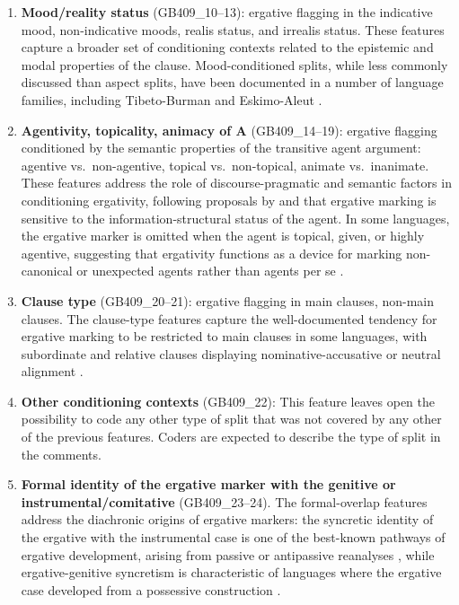 \documentclass[12pt,a4paper]{article}
\begin{document}
\begin{enumerate}
\item \textbf{Mood/reality status} (GB409\_10--13): ergative flagging in the indicative mood, non-indicative moods, realis status, and irrealis status. These features capture a broader set of conditioning contexts related to the epistemic and modal properties of the clause. Mood-conditioned splits, while less commonly discussed than aspect splits, have been documented in a number of language families, including Tibeto-Burman \cite{delancey1981} and Eskimo-Aleut \cite{miyaoka2012}.

\item \textbf{Agentivity, topicality, animacy of A} (GB409\_14--19): ergative flagging conditioned by the semantic properties of the transitive agent argument: agentive vs.\ non-agentive, topical vs.\ non-topical, animate vs.\ inanimate. These features address the role of discourse-pragmatic and semantic factors in conditioning ergativity, following proposals by \cite{givon2001} and \cite{duBois1987} that ergative marking is sensitive to the information-structural status of the agent. In some languages, the ergative marker is omitted when the agent is topical, given, or highly agentive, suggesting that ergativity functions as a device for marking non-canonical or unexpected agents rather than agents per se \cite{mcgregor2010}.

\item \textbf{Clause type}
(GB409\_20--21): ergative flagging in main clauses, non-main clauses. The clause-type features capture the well-documented tendency for ergative marking to be restricted to main clauses in some languages, with subordinate and relative clauses displaying nominative-accusative or neutral alignment \cite{dixon1994}.

\item \textbf{Other conditioning contexts} (GB409\_22): This feature leaves open the possibility to code any other type of split that was not covered by any other of the previous features. Coders are expected to describe the type of split in the comments.

\item \textbf{Formal identity of the ergative marker with the genitive or instrumental/comitative} (GB409\_23--24). The formal-overlap features address the diachronic origins of ergative markers: the syncretic identity of the ergative with the instrumental case is one of the best-known pathways of ergative development, arising from passive or antipassive reanalyses \cite{garrett1990,estival1985}, while ergative-genitive syncretism is characteristic of languages where the ergative case developed from a possessive construction \cite{blake2001}.
\end{enumerate}
\end{document}

